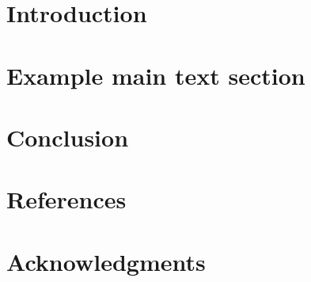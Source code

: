 \newif\iflinenumbers
\linenumberstrue  %

 







\clearpage


\tableofcontents
\clearpage


\section{Introduction}



\section{Example main text section}\label{SEC:Main}



\section{Conclusion}




\clearpage

\section{References}
\customprintbibliography


\clearpage
\section{Acknowledgments}


